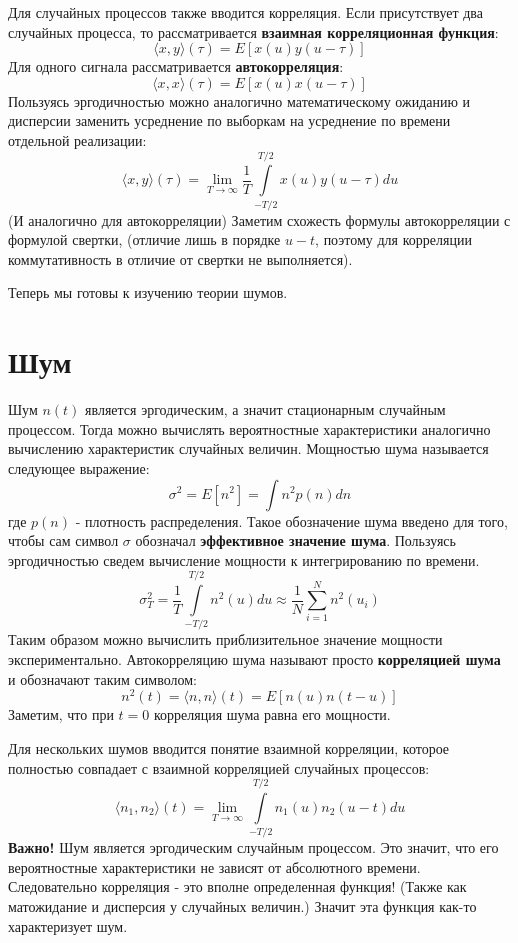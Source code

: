 \documentclass[a4paper, 12pt]{article}
\begin{document}
Для случайных процессов также вводится корреляция. 
Если присутствует два случайных процесса, то рассматривается \textbf{взаимная корреляционная функция}:
$$
\langle x, y \rangle (\tau) = E\left[ x(u)y(u-\tau) \right]
$$
Для одного сигнала рассматривается \textbf{автокорреляция}:
$$
\langle x, x \rangle (\tau) = E\left[ x(u)x(u-\tau) \right]
$$
Пользуясь эргодичностью можно аналогично математическому ожиданию и дисперсии заменить усреднение по выборкам на усреднение по времени отдельной реализации:
$$
\langle x, y \rangle (\tau) = \lim\limits_{T \rightarrow\infty}\frac{1}{T}\int\limits_{-T/2}^{T/2}x(u)y(u-\tau)du
$$
(И аналогично для автокорреляции)
Заметим схожесть формулы автокорреляции с формулой свертки, (отличие лишь в порядке $u-t$, поэтому для корреляции коммутативность в отличие от свертки не выполняется).

Теперь мы готовы к изучению теории шумов.

\section{Шум}
Шум $n(t)$ является эргодическим, а значит стационарным случайным процессом. Тогда можно вычислять вероятностные характеристики аналогично вычислению характеристик случайных величин. Мощностью шума называется следующее выражение:
$$
\sigma^2 = E[n^2] = \int n^2 p(n)dn
$$
где $p(n)$ - плотность распределения. Такое обозначение шума введено для того, чтобы сам символ $\sigma$ обозначал \textbf{эффективное значение шума}.
Пользуясь эргодичностью сведем вычисление мощности к интегрированию по времени.
$$
\sigma_T^2 = \frac{1}{T}\int\limits^{T/2}_{-T/2}n^2(u)du \approx \frac{1}{N}\sum\limits_{i=1}^N n^2(u_i)
$$
Таким образом можно вычислить приблизительное значение мощности экспериментально. Автокорреляцию шума называют просто \textbf{корреляцией шума} и обозначают таким символом:
$$
n^2(t) = \langle n, n \rangle (t) = E[n(u)n(t-u)]
$$
Заметим, что при $t = 0$ корреляция шума равна его мощности.

Для нескольких шумов вводится понятие взаимной корреляции, которое полностью совпадает с взаимной корреляцией случайных процессов:
$$
\langle n_1, n_2 \rangle (t) = \lim\limits_{T \rightarrow\infty}\int\limits_{-T/2}^{T/2}n_1(u)n_2(u-t)du
$$
\textbf{Важно!} Шум является эргодическим случайным процессом. Это значит, что его вероятностные характеристики не зависят от абсолютного времени. Следовательно корреляция - это вполне определенная функция! (Также как матожидание и дисперсия у случайных величин.) Значит эта функция как-то характеризует шум.
\end{document}
